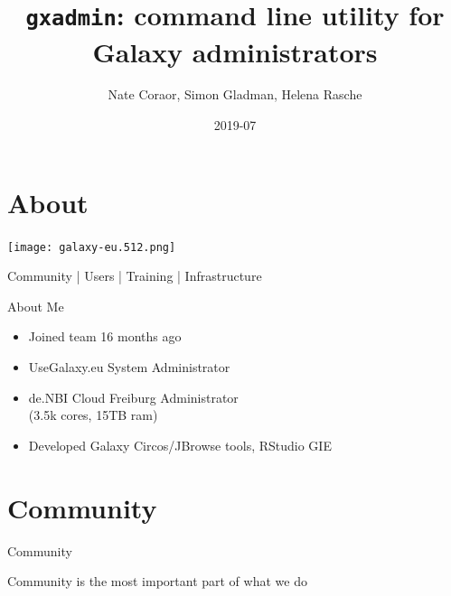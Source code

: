 \documentclass[12pt]{euslides}
\title[gxadmin]{\texttt{gxadmin}: command line utility for Galaxy administrators}
\author{Nate Coraor, Simon Gladman, Helena Rasche}
\date{2019-07}
\begin{document}
\frame{\titlepage}

\section{About}
\begin{frame}{}
\texttt{[image: galaxy-eu.512.png]}
\ \\
\begin{center}
	Community | Users | Training | Infrastructure
\end{center}
\end{frame}

\begin{frame}{About Me}
	\begin{itemize}
		\item Joined team 16 months ago
		\item UseGalaxy.eu System Administrator
		\item de.NBI Cloud Freiburg Administrator \\(3.5k cores, 15TB ram)
		\item Developed Galaxy Circos/JBrowse tools, RStudio GIE
	\end{itemize}
\end{frame}

\section{Community}
\begin{frame}{Community}
	\begin{center}
		\Large Community is the most important part of what we do
	\end{center}
\end{frame}
\end{document}
